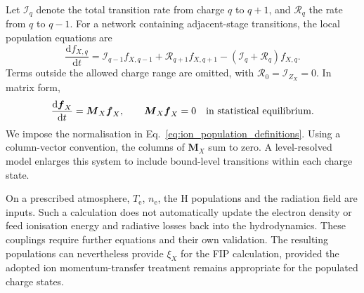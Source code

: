 \documentclass[a4paper,10pt,twoside,openany]{book}
\begin{document}
Let \(\mathcal I_q\) denote the total transition rate from charge \(q\) to
\(q+1\), and \(\mathcal R_q\) the rate from \(q\) to \(q-1\).
For a network containing adjacent-stage transitions, the local population
equations are
\begin{equation}
 \frac{\mathrm d f_{X,q}}{\mathrm dt}
 =\mathcal I_{q-1}f_{X,q-1}
  +\mathcal R_{q+1}f_{X,q+1}
  -(\mathcal I_q+\mathcal R_q)f_{X,q}.
 \label{eq:ion_multistage}
\end{equation}
Terms outside the allowed charge range are omitted, with
\(\mathcal R_0=\mathcal I_{Z_X}=0\).
In matrix form,
\begin{equation}
 \frac{\mathrm d\boldsymbol f_X}{\mathrm dt}
 =\boldsymbol M_X\boldsymbol f_X,
 \qquad
 \boldsymbol M_X\boldsymbol f_X=0
 \quad\hbox{in statistical equilibrium}.
 \label{eq:ion_rate_matrix}
\end{equation}
We impose the normalisation in Eq.~\eqref{eq:ion_population_definitions}.
Using a column-vector convention, the columns of \(\boldsymbol M_X\) sum to
zero. A level-resolved model enlarges this system to include bound-level
transitions within each charge state.

On a prescribed atmosphere, \(T_{\mathrm e}\), \(n_{\mathrm e}\), the H
populations and the radiation field are inputs. Such a calculation does not
automatically update the electron density or feed ionisation energy and
radiative losses back into the hydrodynamics. These couplings require further
equations and their own validation. The resulting populations can nevertheless
provide \(\xi_X\) for the FIP calculation, provided the adopted ion
momentum-transfer treatment remains appropriate for the populated charge states.
\end{document}

